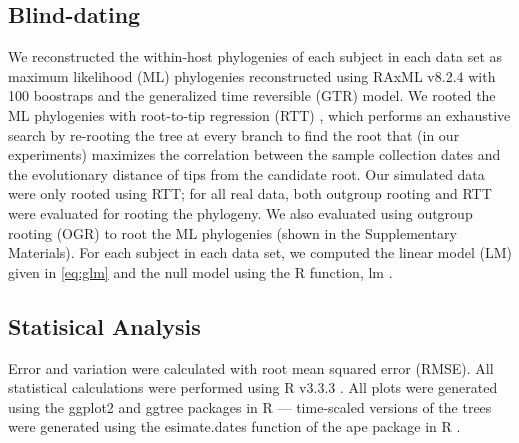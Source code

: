 \documentclass[10pt,twocolumn,twoside]{pnas-new}
\begin{document}
{\subsection*{Blind-dating}
We reconstructed the within-host phylogenies of each subject in each data set as maximum likelihood (ML) phylogenies reconstructed using RAxML v8.2.4 \cite{raxml} with 100 boostraps and the generalized time reversible (GTR) model.
We rooted the ML phylogenies with root-to-tip regression (RTT) \cite{Korber00}, which performs an exhaustive search by re-rooting the tree at every branch to find the root that (in our experiments) maximizes the correlation between the sample collection dates and the evolutionary distance of tips from the candidate root.
Our simulated data were only rooted using RTT; for all real data, both outgroup rooting and RTT were evaluated for rooting the phylogeny.
We also evaluated using outgroup rooting (OGR) to root the ML phylogenies (shown in the Supplementary Materials).
For each subject in each data set, we computed the linear model (LM) given in \cref{eq:glm} and the null model using the R function, lm \cite{rscript}.
\subsection*{Statisical Analysis}
Error and variation were calculated with root mean squared error (RMSE).
All statistical calculations were performed using R v3.3.3 \cite{rscript}.
All plots were generated using the ggplot2 and ggtree packages in R \cite{ggplot,ggtree} --- time-scaled versions of the trees were generated using the esimate.dates function of the ape package in R \cite{ape,nodedating}.
}

\showmatmethods{} %





\end{document}
